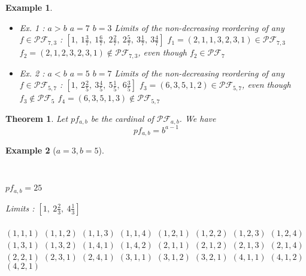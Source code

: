 \documentclass[12pt]{report}
\newtheorem{theorem}{Theorem}
\newtheorem*{example}{Example}
\begin{document}
\begin{example}
    ~\\
    \begin{itemize}
        \item Ex. 1 : $a > b$
            \subitem $a = 7$
            \subitem $b = 3$
            \subitem Limits of the non-decreasing
            reordering of any $f \in \mathcal{PF}_{7,3}$ :
            \subitem $[1,\ 1 \frac{3}{7},\ 1 \frac{6}{7},\ 
            2 \frac{2}{7},\ 2 \frac{5}{7},\ 3 \frac{1}{7},\ 
            3 \frac{4}{7}]$
            \subitem $f_1 = (2, 1, 1, 3, 2, 3, 1) \in
            \mathcal{PF}_{7,3}$
            \subitem $f_2 = (2, 1, 2, 3, 2, 3, 1) \notin
            \mathcal{PF}_{7,3}$, even though $f_2 \in
            \mathcal{PF}_7$
        \item Ex. 2 : $a < b$
            \subitem $a = 5$
            \subitem $b = 7$
            \subitem Limits of the non-decreasing            
            reordering of any $f \in \mathcal{PF}_{5,7}$ :
            \subitem $[1,\ 2 \frac{2}{5},\ 3 \frac{4}{5},\ 
            5 \frac{1}{5},\ 6 \frac{3}{5}]$
            \subitem $f_3 = (6, 3, 5, 1, 2) \in
            \mathcal{PF}_{5,7}$, even though $f_3 \notin
            \mathcal{PF}_5$
            \subitem $f_4 = (6, 3, 5, 1, 3) \notin
            \mathcal{PF}_{5,7}$\\
    \end{itemize}
\end{example}

\begin{theorem}
    Let $pf_{a,b}$ be the cardinal of $\mathcal{PF}_{a,b}$.
    We have $$pf_{a,b} = b^{a-1}$$
\end{theorem}

\begin{example}[$a = 3, b = 5$]
    ~\\
    \begin{itemize*}\\
        \item $pf_{a,b} = 25$
        \item Limits : $[1,\ 2 \frac{2}{3},\ 
            4 \frac{1}{3}]$\\\\
        \subitem $(1, 1, 1)$
        \subitem $(1, 1, 2)$
        \subitem $(1, 1, 3)$
        \subitem $(1, 1, 4)$
        \subitem $(1, 2, 1)$
        \subitem $(1, 2, 2)$
        \subitem $(1, 2, 3)$
        \subitem $(1, 2, 4)$
        \subitem $(1, 3, 1)$
        \subitem $(1, 3, 2)$
        \subitem $(1, 4, 1)$
        \subitem $(1, 4, 2)$
        \subitem $(2, 1, 1)$
        \subitem $(2, 1, 2)$
        \subitem $(2, 1, 3)$
        \subitem $(2, 1, 4)$
        \subitem $(2, 2, 1)$
        \subitem $(2, 3, 1)$
        \subitem $(2, 4, 1)$
        \subitem $(3, 1, 1)$
        \subitem $(3, 1, 2)$
        \subitem $(3, 2, 1)$
        \subitem $(4, 1, 1)$
        \subitem $(4, 1, 2)$
        \subitem $(4, 2, 1)$
    \end{itemize*}
\end{example}
\end{document}
